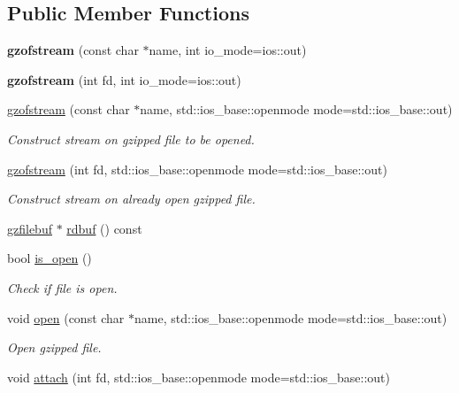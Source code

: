 \subsection*{Public Member Functions}
\begin{DoxyCompactItemize}
\item 
\mbox{\label{classgzofstream_aad6a405bc9ecfd82cc0861a15e4a6983}} 
{\bfseries gzofstream} (const char $\ast$name, int io\+\_\+mode=ios\+::out)
\item 
\mbox{\label{classgzofstream_a5291a0c4c0e7f6f18ca72ae98f4e4d40}} 
{\bfseries gzofstream} (int fd, int io\+\_\+mode=ios\+::out)
\item 
\hyperlink{classgzofstream_a4334d31aab99f8c9c2277b672a55c78f}{gzofstream} (const char $\ast$name, std\+::ios\+\_\+base\+::openmode mode=std\+::ios\+\_\+base\+::out)
\begin{DoxyCompactList}\small\item\em Construct stream on gzipped file to be opened. \end{DoxyCompactList}\item 
\hyperlink{classgzofstream_aa94d0c8414119a52f2a7f42aa0440941}{gzofstream} (int fd, std\+::ios\+\_\+base\+::openmode mode=std\+::ios\+\_\+base\+::out)
\begin{DoxyCompactList}\small\item\em Construct stream on already open gzipped file. \end{DoxyCompactList}\item 
\hyperlink{classgzfilebuf}{gzfilebuf} $\ast$ \hyperlink{classgzofstream_a2fef74202b114357f41cfeb28f1d2acc}{rdbuf} () const
\item 
bool \hyperlink{classgzofstream_acb1c9c6dccaf41bc5e44c2263ea48de3}{is\+\_\+open} ()
\begin{DoxyCompactList}\small\item\em Check if file is open. \end{DoxyCompactList}\item 
void \hyperlink{classgzofstream_aee3eb31f07eda7f5ad1f60d59ea4b239}{open} (const char $\ast$name, std\+::ios\+\_\+base\+::openmode mode=std\+::ios\+\_\+base\+::out)
\begin{DoxyCompactList}\small\item\em Open gzipped file. \end{DoxyCompactList}\item 
void \hyperlink{classgzofstream_a95b76eaecd03b6cbf53d2f4b1c867439}{attach} (int fd, std\+::ios\+\_\+base\+::openmode mode=std\+::ios\+\_\+base\+::out)

\end{DoxyCompactItemize}
